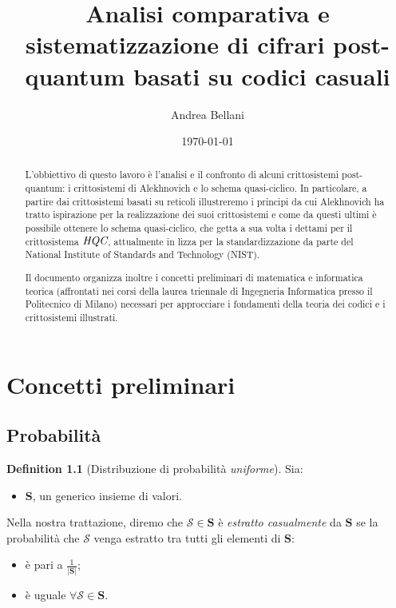 \documentclass[12pt, a4paper]{report}
\theoremstyle{definition}
\newtheorem{definition}{Definition}[section]
\begin{document}
	\title{Analisi comparativa e sistematizzazione di cifrari post-quantum basati su codici casuali}
	\author{Andrea Bellani}
	\date{\today}
	
	\maketitle
	
	\begin{abstract}
		L'obbiettivo di questo lavoro è l'analisi e il confronto di alcuni crittosistemi post-quantum: i crittosistemi di Alekhnovich e lo schema quasi-ciclico. In particolare, a partire dai crittosistemi basati su reticoli illustreremo i principi da cui Alekhnovich ha tratto ispirazione per la realizzazione dei suoi crittosistemi e come da questi ultimi è possibile ottenere lo schema quasi-ciclico, che getta a sua volta i dettami per il crittosistema $\emph{HQC}$, attualmente in lizza per la standardizzazione da parte del National Institute of Standards and Technology (NIST).
		
		Il documento organizza inoltre i concetti preliminari di matematica e informatica teorica (affrontati nei corsi della laurea triennale di Ingegneria Informatica presso il Politecnico di Milano) necessari per approcciare i fondamenti della teoria dei codici e i crittosistemi illustrati.
	\end{abstract}
	\tableofcontents
	
	\chapter{Concetti preliminari}
		\section{Probabilità \cite{1}}
			\begin{definition}[Distribuzione di probabilità \emph{uniforme}]
				Sia:
					\begin{itemize}
						\item $\mathbf{S}$, un generico insieme di valori.
					\end{itemize}
				Nella nostra trattazione, diremo che $\mathcal{S}\in \mathbf{S}$ è \emph{estratto casualmente} da $\mathbf{S}$ se la probabilità che $\mathcal{S}$ venga estratto tra tutti gli elementi di $\mathbf{S}$:
					\begin{itemize}
						\item è pari a $\frac{1}{|\mathbf{S}|}$;
						\item è uguale $\forall \mathcal{S}\in \mathbf{S}$.
					\end{itemize}
			\end{definition}
\end{document}
